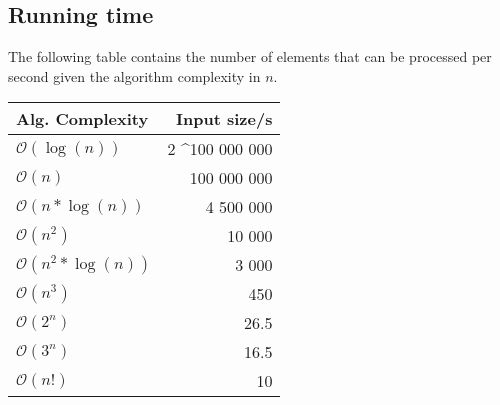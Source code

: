 \documentclass[8pt,a4paper,landscape,oneside]{amsart}
\newcommand{\bigO}{\mathcal{O}}
\begin{document}
\begin{multicols*}{3}
\section{Running time}
The following table contains the number of elements that can be processed per second given the algorithm complexity in $n$.
\begin{center}
\begin{tabular}{lr}
Alg. Complexity & Input size/s \\ \hline
$\bigO(\log(n))$     & 2 \textasciicircum 100 000 000 \\
$\bigO(n)$           & 100 000 000 \\
$\bigO(n*\log(n))$   & 4 500 000 \\
$\bigO(n^2)$         & 10 000 \\
$\bigO(n^2*\log(n))$ & 3 000 \\
$\bigO(n^3)$         & 450 \\
$\bigO(2^n)$         & 26.5 \\
$\bigO(3^n)$         & 16.5 \\
$\bigO(n!)$          & 10
\end{tabular}
\end{center}



\end{multicols*}
\end{document}

